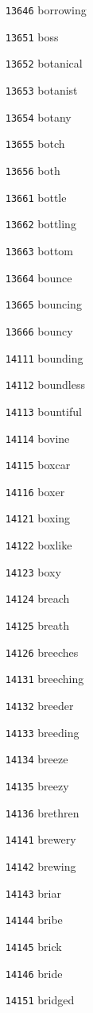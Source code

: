 \documentclass[twoside,11pt]{article}
\begin{document}
\begin{multicols}{5}
\begin{enumerate}
\item[\texttt{13646}] borrowing
\item[\texttt{13651}] boss
\item[\texttt{13652}] botanical
\item[\texttt{13653}] botanist
\item[\texttt{13654}] botany
\item[\texttt{13655}] botch
\item[\texttt{13656}] both
\item[\texttt{13661}] bottle
\item[\texttt{13662}] bottling
\item[\texttt{13663}] bottom
\item[\texttt{13664}] bounce
\item[\texttt{13665}] bouncing
\item[\texttt{13666}] bouncy
\item[\texttt{14111}] bounding
\item[\texttt{14112}] boundless
\item[\texttt{14113}] bountiful
\item[\texttt{14114}] bovine
\item[\texttt{14115}] boxcar
\item[\texttt{14116}] boxer
\item[\texttt{14121}] boxing
\item[\texttt{14122}] boxlike
\item[\texttt{14123}] boxy
\item[\texttt{14124}] breach
\item[\texttt{14125}] breath
\item[\texttt{14126}] breeches
\item[\texttt{14131}] breeching
\item[\texttt{14132}] breeder
\item[\texttt{14133}] breeding
\item[\texttt{14134}] breeze
\item[\texttt{14135}] breezy
\item[\texttt{14136}] brethren
\item[\texttt{14141}] brewery
\item[\texttt{14142}] brewing
\item[\texttt{14143}] briar
\item[\texttt{14144}] bribe
\item[\texttt{14145}] brick
\item[\texttt{14146}] bride
\item[\texttt{14151}] bridged

\end{enumerate}
\end{multicols}
\end{document}
